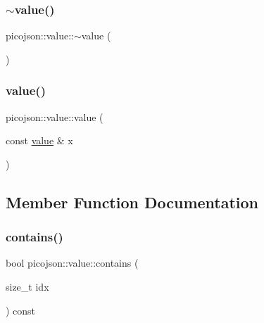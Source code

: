 \hypertarget{classpicojson_1_1value_aa75329d73af82b8a7daab1905f8609d0}{}\label{classpicojson_1_1value_aa75329d73af82b8a7daab1905f8609d0} 
\subsubsection{\texorpdfstring{$\sim$value()}{~value()}}
{\footnotesize\ttfamily picojson\+::value\+::$\sim$value (\begin{DoxyParamCaption}{ }\end{DoxyParamCaption})\hspace{0.3cm}{\ttfamily [inline]}}

\hypertarget{classpicojson_1_1value_a89a827eee72398d3678509cdd65c777d}{}\label{classpicojson_1_1value_a89a827eee72398d3678509cdd65c777d} 
\subsubsection{\texorpdfstring{value()}{value()}\hspace{0.1cm}{\footnotesize\ttfamily [10/10]}}
{\footnotesize\ttfamily picojson\+::value\+::value (\begin{DoxyParamCaption}\item[{const \hyperlink{classpicojson_1_1value}{value} \&}]{x }\end{DoxyParamCaption})\hspace{0.3cm}{\ttfamily [inline]}}



\subsection{Member Function Documentation}
\hypertarget{classpicojson_1_1value_a2d694ee5607fe8ff865fb39c92ef8bdb}{}\label{classpicojson_1_1value_a2d694ee5607fe8ff865fb39c92ef8bdb} 
\subsubsection{\texorpdfstring{contains()}{contains()}\hspace{0.1cm}{\footnotesize\ttfamily [1/2]}}
{\footnotesize\ttfamily bool picojson\+::value\+::contains (\begin{DoxyParamCaption}\item[{size\+\_\+t}]{idx }\end{DoxyParamCaption}) const\hspace{0.3cm}{\ttfamily [inline]}}


